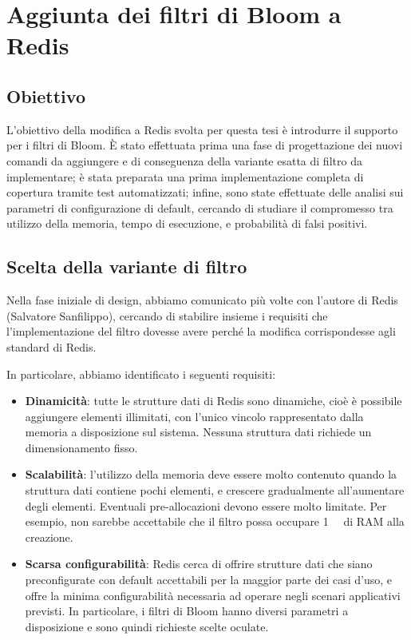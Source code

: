 \chapter{Aggiunta dei filtri di Bloom a Redis}

\section{Obiettivo}

L'obiettivo della modifica a Redis svolta per questa tesi è introdurre il supporto per i filtri di
Bloom. È stato effettuata prima una fase di progettazione dei nuovi comandi da aggiungere e di
conseguenza della variante esatta di filtro da implementare; è stata preparata una prima
implementazione completa di copertura tramite test automatizzati; infine, sono state effettuate
delle analisi sui parametri di configurazione di default, cercando di studiare il compromesso tra
utilizzo della memoria, tempo di esecuzione, e probabilità di falsi positivi.

\section{Scelta della variante di filtro}

Nella fase iniziale di design, abbiamo comunicato più volte con l'autore di Redis (Salvatore
Sanfilippo), cercando di stabilire insieme i requisiti che l'implementazione del filtro dovesse
avere perché la modifica corrispondesse agli standard di Redis.

In particolare, abbiamo identificato i seguenti requisiti:

\begin{itemize}
	\medskip
	\item \textbf{Dinamicità}: tutte le strutture dati di Redis sono dinamiche, cioè è possibile
	aggiungere elementi illimitati, con l'unico vincolo rappresentato dalla memoria a disposizione
	sul sistema. Nessuna struttura dati richiede un dimensionamento fisso.

	\item \textbf{Scalabilità}: l'utilizzo della memoria deve essere molto contenuto quando la
	struttura dati contiene pochi elementi, e crescere gradualmente all'aumentare degli elementi.
	Eventuali pre-allocazioni devono essere molto limitate. Per esempio, non sarebbe accettabile che
	il filtro possa occupare \SI{1}{\mega\byte} di RAM alla creazione.

	\item \textbf{Scarsa configurabilità}: Redis cerca di offrire strutture dati che siano
	preconfigurate con default accettabili per la maggior parte dei casi d'uso, e offre la minima
	configurabilità necessaria ad operare negli scenari applicativi previsti. In particolare,
	i filtri di Bloom hanno diversi parametri a disposizione e sono quindi richieste scelte
	oculate.
\end{itemize}

